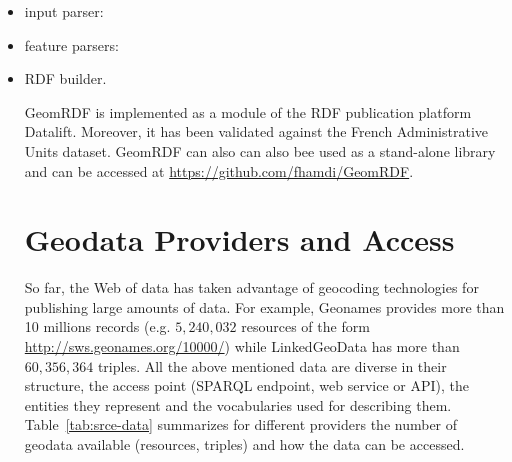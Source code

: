 \begin{itemize}
\item input parser:
\item feature parsers: 
\item  RDF builder.

GeomRDF is implemented as a module of the RDF publication platform Datalift. Moreover, it has been validated against the French Administrative Units dataset. GeomRDF can also can also bee used as a stand-alone library and can be accessed at \url{https://github.com/fhamdi/GeomRDF}.



    


\section{Geodata Providers and Access}
So far, the Web of data has taken advantage of geocoding technologies for publishing large amounts of data. For example, Geonames provides more than 10 millions records (e.g. $5,240,032$ resources of the form \url{http://sws.geonames.org/10000/}) while LinkedGeoData has more than $60,356,364$ triples. All the above mentioned data are diverse in their structure, the access point (SPARQL endpoint, web service or API), the entities they represent and the vocabularies used for describing them. Table~\ref{tab:srce-data} summarizes for different providers the number of geodata available (resources, triples) and how the data can be accessed.


\end{itemize}
